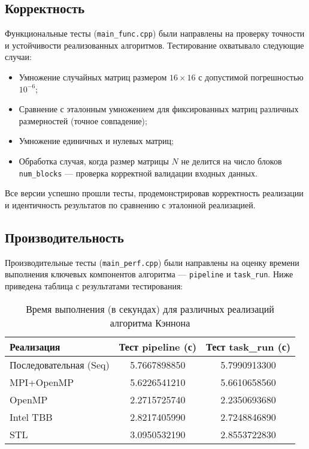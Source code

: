 \documentclass[a4paper,12pt]{article}
\begin{document}
\subsection{Корректность}

Функциональные тесты (\texttt{main\_func.cpp}) были направлены на проверку точности и устойчивости реализованных алгоритмов. Тестирование охватывало следующие случаи:
\begin{itemize}
    \item Умножение случайных матриц размером $16 \times 16$ с допустимой погрешностью $10^{-6}$;
    \item Сравнение с эталонным умножением для фиксированных матриц различных размерностей (точное совпадение);
    \item Умножение единичных и нулевых матриц;
    \item Обработка случая, когда размер матрицы $N$ не делится на число блоков \texttt{num\_blocks} — проверка корректной валидации входных данных.
\end{itemize}
Все версии успешно прошли тесты, продемонстрировав корректность реализации и идентичность результатов по сравнению с эталонной реализацией.

\subsection{Производительность}

Производительные тесты (\texttt{main\_perf.cpp}) были направлены на оценку времени выполнения ключевых компонентов алгоритма — \texttt{pipeline} и \texttt{task\_run}. Ниже приведена таблица с результатами тестирования:

\begin{table}[h]
\centering
\caption{Время выполнения (в секундах) для различных реализаций алгоритма Кэннона}
\begin{tabular}{lcc}
\toprule
\textbf{Реализация} & \textbf{Тест pipeline (с)} & \textbf{Тест task\_run (с)} \\
\midrule
Последовательная (Seq) & 5.7667898850 & 5.7990913300 \\
MPI+OpenMP & 5.6226541210 & 5.6610658560 \\
OpenMP & 2.2715725740 & 2.2350693680 \\
Intel TBB & 2.8217405990 & 2.7248846890 \\
STL & 3.0950532190 & 2.8553722830 \\
\bottomrule
\end{tabular}
\end{table}
\end{document}
